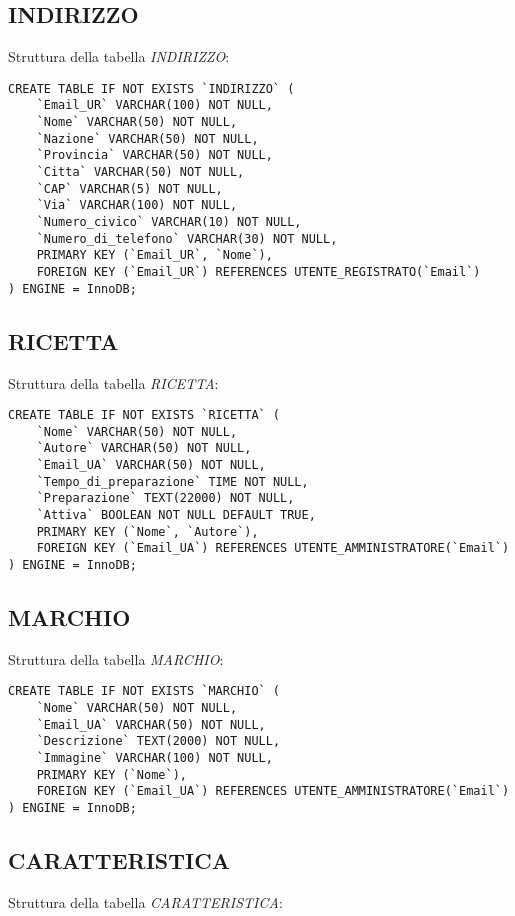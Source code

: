 \subsection{INDIRIZZO}
Struttura della tabella \emph{INDIRIZZO}:

\begin{lstlisting}
CREATE TABLE IF NOT EXISTS `INDIRIZZO` (
	`Email_UR` VARCHAR(100) NOT NULL,
	`Nome` VARCHAR(50) NOT NULL,
	`Nazione` VARCHAR(50) NOT NULL,
	`Provincia` VARCHAR(50) NOT NULL,
	`Citta` VARCHAR(50) NOT NULL,
	`CAP` VARCHAR(5) NOT NULL,
	`Via` VARCHAR(100) NOT NULL,
	`Numero_civico` VARCHAR(10) NOT NULL,
	`Numero_di_telefono` VARCHAR(30) NOT NULL,
	PRIMARY KEY (`Email_UR`, `Nome`),
	FOREIGN KEY (`Email_UR`) REFERENCES UTENTE_REGISTRATO(`Email`)
) ENGINE = InnoDB;
\end{lstlisting}

\subsection{RICETTA}
Struttura della tabella \emph{RICETTA}:

\begin{lstlisting}
CREATE TABLE IF NOT EXISTS `RICETTA` (
	`Nome` VARCHAR(50) NOT NULL,
	`Autore` VARCHAR(50) NOT NULL,
	`Email_UA` VARCHAR(50) NOT NULL,
	`Tempo_di_preparazione` TIME NOT NULL,
	`Preparazione` TEXT(22000) NOT NULL,
	`Attiva` BOOLEAN NOT NULL DEFAULT TRUE,
	PRIMARY KEY (`Nome`, `Autore`),
	FOREIGN KEY (`Email_UA`) REFERENCES UTENTE_AMMINISTRATORE(`Email`)
) ENGINE = InnoDB;
\end{lstlisting}

\newpage

\subsection{MARCHIO}
Struttura della tabella \emph{MARCHIO}:

\begin{lstlisting}
CREATE TABLE IF NOT EXISTS `MARCHIO` (
	`Nome` VARCHAR(50) NOT NULL,
	`Email_UA` VARCHAR(50) NOT NULL,
	`Descrizione` TEXT(2000) NOT NULL,
	`Immagine` VARCHAR(100) NOT NULL,
	PRIMARY KEY (`Nome`),
	FOREIGN KEY (`Email_UA`) REFERENCES UTENTE_AMMINISTRATORE(`Email`)
) ENGINE = InnoDB;
\end{lstlisting}

\subsection{CARATTERISTICA}
Struttura della tabella \emph{CARATTERISTICA}:

